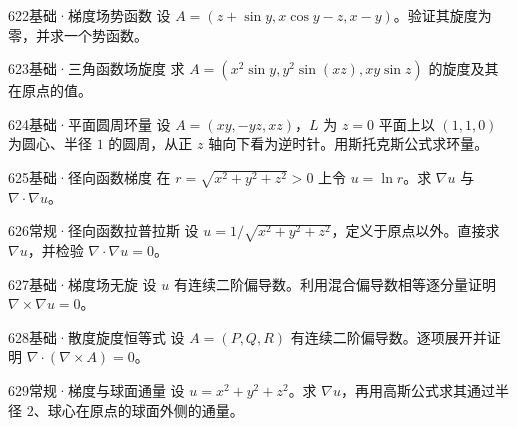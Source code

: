 \begin{exercise}{622}{基础·梯度场势函数}
设 $A=(z+\sin y,x\cos y-z,x-y)$。验证其旋度为零，并求一个势函数。
\end{exercise}
\begin{exercise}{623}{基础·三角函数场旋度}
求 $A=(x^2\sin y,y^2\sin(xz),xy\sin z)$ 的旋度及其在原点的值。
\end{exercise}
\begin{exercise}{624}{基础·平面圆周环量}
设 $A=(xy,-yz,xz)$，$L$ 为 $z=0$ 平面上以 $(1,1,0)$ 为圆心、半径 $1$ 的圆周，从正 $z$ 轴向下看为逆时针。用斯托克斯公式求环量。
\end{exercise}
\begin{exercise}{625}{基础·径向函数梯度}
在 $r=\sqrt{x^2+y^2+z^2}>0$ 上令 $u=\ln r$。求 $\nabla u$ 与 $\nabla\cdot\nabla u$。
\end{exercise}
\begin{exercise}{626}{常规·径向函数拉普拉斯}
设 $u=1/\sqrt{x^2+y^2+z^2}$，定义于原点以外。直接求 $\nabla u$，并检验 $\nabla\cdot\nabla u=0$。
\end{exercise}
\begin{exercise}{627}{基础·梯度场无旋}
设 $u$ 有连续二阶偏导数。利用混合偏导数相等逐分量证明 $\nabla\times\nabla u=0$。
\end{exercise}
\begin{exercise}{628}{基础·散度旋度恒等式}
设 $A=(P,Q,R)$ 有连续二阶偏导数。逐项展开并证明 $\nabla\cdot(\nabla\times A)=0$。
\end{exercise}
\begin{exercise}{629}{常规·梯度与球面通量}
设 $u=x^2+y^2+z^2$。求 $\nabla u$，再用高斯公式求其通过半径 $2$、球心在原点的球面外侧的通量。
\end{exercise}
